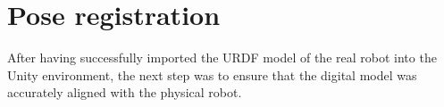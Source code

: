




\section{Pose registration}

After having successfully imported the \ac{URDF} model of the real robot into the Unity environment, the next step was to ensure that the digital model was accurately aligned with the physical robot. 

